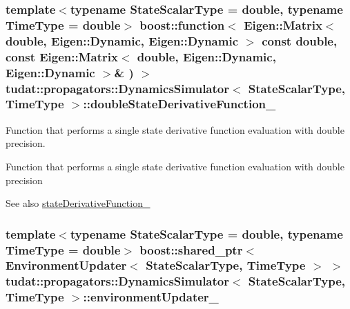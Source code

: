 \subsubsection[{\texorpdfstring{double\+State\+Derivative\+Function\+\_\+}{doubleStateDerivativeFunction_}}]{\setlength{\rightskip}{0pt plus 5cm}template$<$typename State\+Scalar\+Type  = double, typename Time\+Type  = double$>$ boost\+::function$<$ Eigen\+::\+Matrix$<$ double, Eigen\+::\+Dynamic, Eigen\+::\+Dynamic $>$ const double, const Eigen\+::\+Matrix$<$ double, Eigen\+::\+Dynamic, Eigen\+::\+Dynamic $>$\& ) $>$ {\bf tudat\+::propagators\+::\+Dynamics\+Simulator}$<$ State\+Scalar\+Type, Time\+Type $>$\+::double\+State\+Derivative\+Function\+\_\+\hspace{0.3cm}{\ttfamily [protected]}}\hypertarget{classtudat_1_1propagators_1_1DynamicsSimulator_a13c8abe9d1ec9edcfedd5ec6c37246ee}{}\label{classtudat_1_1propagators_1_1DynamicsSimulator_a13c8abe9d1ec9edcfedd5ec6c37246ee}


Function that performs a single state derivative function evaluation with double precision. 

Function that performs a single state derivative function evaluation with double precision \begin{DoxySeeAlso}{See also}
\hyperlink{classtudat_1_1propagators_1_1DynamicsSimulator_af70e7d7f3f0d4020ad5daba0b0d29a06}{state\+Derivative\+Function\+\_\+} 
\end{DoxySeeAlso}
\subsubsection[{\texorpdfstring{environment\+Updater\+\_\+}{environmentUpdater_}}]{\setlength{\rightskip}{0pt plus 5cm}template$<$typename State\+Scalar\+Type  = double, typename Time\+Type  = double$>$ boost\+::shared\+\_\+ptr$<$ {\bf Environment\+Updater}$<$ State\+Scalar\+Type, Time\+Type $>$ $>$ {\bf tudat\+::propagators\+::\+Dynamics\+Simulator}$<$ State\+Scalar\+Type, Time\+Type $>$\+::environment\+Updater\+\_\+\hspace{0.3cm}{\ttfamily [protected]}}\hypertarget{classtudat_1_1propagators_1_1DynamicsSimulator_a4f2d6fc2e3ffbb06da4f8e621ae1c242}{}\label{classtudat_1_1propagators_1_1DynamicsSimulator_a4f2d6fc2e3ffbb06da4f8e621ae1c242}



